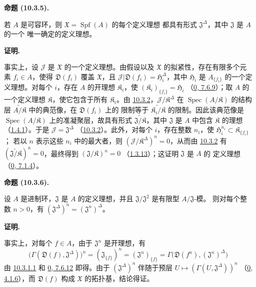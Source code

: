 \documentclass[UTF8,fontset=none,11pt,oneside,openany]{ctexbook}
\newenvironment{proposition}[1][]{%
  \par\medskip\noindent\textbf{命题 (#1).}\ %
}{\par}
\newenvironment{proof}{%
  \par\medskip\noindent\textbf{证明.}\ %
}{\par}
\newcommand{\oldpage}[2][]{%
  \hypertarget{ega-source-page-#1-#2}{}%
  \marginnote{\scriptsize\textbf{#1}~|~#2}\ignorespaces}
\let\EGAOriginalLabel\label
\renewcommand{\label}[1]{\phantomsection\EGAOriginalLabel{#1}}
\begin{document}
\begin{proposition}[10.3.5]
\label{I.10.3.5-fr}
若 $A$ 是可容环，则 $\mathfrak{X}=\operatorname{Spf}(A)$ 的每个定义理想
都具有形式 $\mathfrak{J}^\Delta$，其中 $\mathfrak{J}$ 是 $A$ 的一个
唯一确定的定义理想。
\end{proposition}

\begin{proof}
事实上，设 $\mathscr{J}$ 是 $\mathfrak{X}$ 的一个定义理想。由假设以及
$\mathfrak{X}$ 的拟紧性，存在有限多个元素 $f_i\in A$，使得
$\mathfrak{D}(f_i)$ 覆盖 $\mathfrak{X}$，且
$\mathscr{J}|\mathfrak{D}(f_i)=\mathfrak{H}_i^\Delta$，其中
$\mathfrak{H}_i$ 是 $A_{\{f_i\}}$ 的一个定义理想。对每个 $i$，存在
$A$ 的开理想 $\mathfrak{K}_i$，使
$(\mathfrak{K}_i)_{\{f_i\}}=\mathfrak{H}_i$
（\hyperref[0.7.6.9-fr]{0, 7.6.9}）；取 $A$ 的一个定义理想
$\mathfrak{K}$，使它包含于所有 $\mathfrak{K}_i$。由
\hyperref[I.10.3.2-fr]{10.3.2}，$\mathscr{J}/\mathfrak{K}^\Delta$
在 $\operatorname{Spec}(A/\mathfrak{K})$ 的结构层
$\widetilde{A/\mathfrak{K}}$ 中的典范像，在 $\mathfrak{D}(f_i)$ 上的
限制等于 $\widetilde{\mathfrak{K}_i/\mathfrak{K}}$ 的限制。因此该典范像是
$\operatorname{Spec}(A/\mathfrak{K})$ 上的准凝聚层，故具有形式
$\widetilde{\mathfrak{J}/\mathfrak{K}}$，其中 $\mathfrak{J}$ 是 $A$
中包含 $\mathfrak{K}$ 的理想（\hyperref[I.1.4.1-fr]{1.4.1}）。于是
$\mathscr{J}=\mathfrak{J}^\Delta$
（\hyperref[I.10.3.2-fr]{10.3.2}）。此外，对每个 $i$，存在整数
$n_i$，使 $\mathfrak{H}_i^{n_i}\subset\mathfrak{K}_{\{f_i\}}$；
若以 $n$ 表示这些 $n_i$ 中的最大者，则
$(\mathscr{J}/\mathfrak{K}^\Delta)^n=0$，从而由
\hyperref[I.10.3.2-fr]{10.3.2} 有
$(\widetilde{\mathfrak{J}/\mathfrak{K}})^n=0$，最终得到
$(\mathfrak{J}/\mathfrak{K})^n=0$
（\hyperref[I.1.3.13-fr]{1.3.13}）；这证明 $\mathfrak{J}$ 是 $A$ 的
定义理想（\hyperref[0.7.1.4-fr]{0, 7.1.4}）。
\end{proof}

\begin{proposition}[10.3.6]
\label{I.10.3.6-fr}
设 $A$ 是进制环，$\mathfrak{J}$ 是 $A$ 的定义理想，并且
$\mathfrak{J}/\mathfrak{J}^2$ 是有限型 $A/\mathfrak{J}$-模。
则对每个整数 $n>0$，有
$(\mathfrak{J}^\Delta)^n=(\mathfrak{J}^n)^\Delta$。
\end{proposition}

\begin{proof}
事实上，对每个 $f\in A$，由于 $\mathfrak{J}^n$ 是开理想，有
\[
  \bigl(\Gamma(\mathfrak{D}(f),\mathfrak{J}^\Delta)\bigr)^n
  =(\mathfrak{J}_{\{f\}})^n
  =(\mathfrak{J}^n)_{\{f\}}
  =\Gamma\bigl(\mathfrak{D}(f^n),(\mathfrak{J}^n)^\Delta\bigr)
\]
\oldpage[I]{185}
由 \hyperref[I.10.3.1.1-fr]{10.3.1.1} 和
\hyperref[0.7.6.12-fr]{0, 7.6.12} 即得。由于
$(\mathfrak{J}^\Delta)^n$ 伴随于预层
$U\mapsto(\Gamma(U,\mathfrak{J}^\Delta))^n$
（\hyperref[0.4.1.6-fr]{0, 4.1.6}），而 $\mathfrak{D}(f)$ 构成
$\mathfrak{X}$ 的拓扑基，结论得证。
\end{proof}
\end{document}
